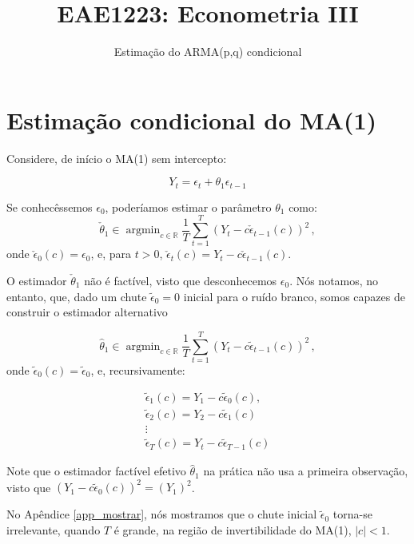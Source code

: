 \documentclass[10pt,a4paper]{article}
\title{\large EAE1223: Econometria III}
\author{\normalsize Estimação do ARMA(p,q) condicional}
\date{}
\begin{document}
\maketitle
\section*{Estimação condicional do MA(1)}

Considere, de início o MA(1) sem intercepto:

$$Y_t = \epsilon_{t} + \theta_1 \epsilon_{t-1}$$

Se conhecêssemos $\epsilon_{0}$, poderíamos estimar o parâmetro $\theta_1$ como:
\begin{equation}
	\check{\theta}_1 \in \operatorname{argmin}_{c \in \mathbb{R}} \frac{1}{T}\sum_{t=1}^T (Y_t - c \check \epsilon_{t-1}(c))^2 \, ,
\end{equation}
onde $\check \epsilon_{0}(c) = \epsilon_{0}$, e, para $t > 0$, $\check \epsilon_{t}(c) = Y_t - c \check \epsilon_{t-1}(c)$.

O estimador $\check{\theta}_1$ não é factível, visto que desconhecemos $\epsilon_{0}$. Nós notamos, no entanto, que, dado um chute $\tilde{\epsilon}_0 = 0$ inicial para o ruído branco, somos capazes de construir o estimador alternativo

\begin{equation}
	\label{eq_feasible}
	\hat{\theta}_1 \in \operatorname{argmin}_{c \in \mathbb{R}} \frac{1}{T}\sum_{t=1}^T (Y_t - c \tilde \epsilon_{t-1}(c))^2 \, ,
\end{equation}
onde $\tilde{\epsilon}_0(c) = \tilde{\epsilon}_0$, e, recursivamente:

\begin{equation*}
	\begin{aligned}
		\tilde{\epsilon}_1(c) = Y_1 - c \tilde{\epsilon}_{0}(c) , \\ 
		\tilde{\epsilon}_2(c)= Y_2 - c\tilde{\epsilon}_{1}(c) \\
		\vdots \\
			\tilde{\epsilon}_T(c)=  Y_t - c\tilde{\epsilon}_{T-1}(c) 
	\end{aligned}
\end{equation*}

Note que o estimador factível efetivo $\hat \theta_1$ na prática não usa a primeira observação, visto que $(Y_1-c \tilde{\epsilon}_0(c))^2 = (Y_1)^2$.

No Apêndice \ref{app_mostrar}, nós mostramos que o chute inicial $\tilde{\epsilon}_0$ torna-se irrelevante, quando $T$ é grande, na região de invertibilidade do MA(1), $|c|<1$.
\end{document}
